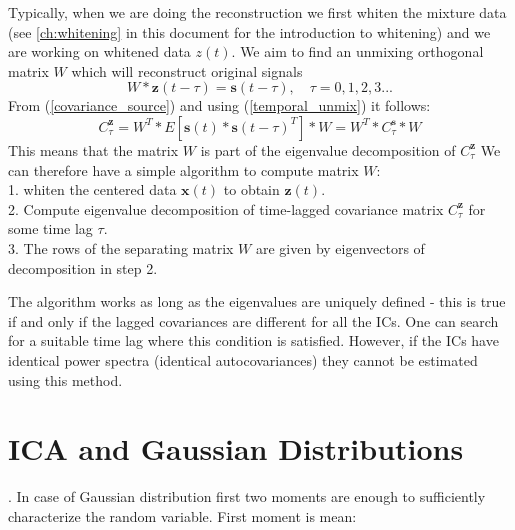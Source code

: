 \documentclass{article}
\begin{document}
Typically, when we are doing the reconstruction we first whiten the mixture data (see \ref{ch:whitening} in this document for the introduction to whitening) and we are working
on whitened data $z(t)$. We aim to find an unmixing orthogonal matrix $W$ which will reconstruct original signals
\begin{equation}
    W*\textbf{z}(t-\tau) = \textbf{s}(t-\tau), \quad \tau=0, 1, 2, 3...
\label{temporal_unmix}
\end{equation}
From (\ref{covariance_source}) and using (\ref{temporal_unmix}) it follows:
\begin{equation}
    C_{\tau}^{\textbf{z}} = W^T * E\left[\textbf{s}(t)*\textbf{s}(t-\tau)^T\right] * W = W^T * C_{\tau}^{\textbf{s}} * W
\end{equation}
This means that the matrix $W$ is part of the eigenvalue decomposition of $ C_{\tau}^{\textbf{z}}$
We can therefore have a simple algorithm \cite{Tong1991} to compute matrix $W$: \\
1. whiten the centered data $\textbf{x}(t)$ to obtain $\textbf{z}(t)$. \\
2. Compute eigenvalue decomposition of time-lagged covariance matrix $C_{\tau}^{\textbf{z}}$ for some time lag $\tau$. \\
3. The rows of the separating matrix $W$ are given by eigenvectors of decomposition in step 2.

The algorithm works as long as the eigenvalues are uniquely defined - this is true if and only if the lagged covariances are different for all the ICs.  One can search for a suitable time lag where this condition is satisfied. However, if the ICs have identical power spectra (identical autocovariances) they cannot be estimated using this method.

\section{ICA and Gaussian Distributions}.
In case of Gaussian distribution first two moments are enough to sufficiently characterize the random variable. First moment is mean:
\end{document}
